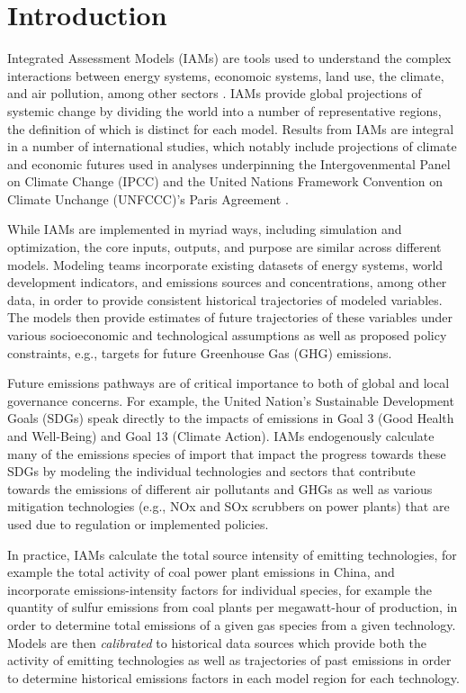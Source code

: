\section{Introduction}

Integrated Assessment Models (IAMs) are tools used to understand the complex
interactions between energy systems, economoic systems, land use, the climate,
and air pollution, among other sectors . IAMs provide
global projections of systemic change by dividing the world into a number of
representative regions, the definition of which is distinct for each
model. Results from IAMs are integral in a number of international studies,
which notably include projections of climate and economic futures used in
analyses underpinning the Intergovenmental Panel on Climate Change (IPCC)
 and the United Nations Framework Convention on Climate Unchange
(UNFCCC)'s Paris Agreement .

While IAMs are implemented in myriad ways, including simulation and
optimization, the core inputs, outputs, and purpose are similar across different
models. Modeling teams incorporate existing datasets of energy systems, world
development indicators, and emissions sources and concentrations, among other
data, in order to provide consistent historical trajectories of modeled
variables. The models then provide estimates of future trajectories of these
variables under various socioeconomic and technological assumptions as well as
proposed policy constraints, e.g., targets for future Greenhouse Gas (GHG)
emissions.

Future emissions pathways are of critical importance to both of global and local
governance concerns. For example, the United Nation's Sustainable Development
Goals (SDGs)  speak directly to the impacts of emissions in Goal 3
(Good Health and Well-Being) and Goal 13 (Climate Action). IAMs endogenously
calculate many of the emissions species of import that impact the progress
towards these SDGs by modeling the individual technologies and sectors that
contribute towards the emissions of different air pollutants and GHGs as well as
various mitigation technologies (e.g., NOx and SOx scrubbers on power plants)
that are used due to regulation or implemented policies.

In practice, IAMs calculate the total source intensity of emitting technologies,
for example the total activity of coal power plant emissions in China, and
incorporate emissions-intensity factors for individual species, for example the
quantity of sulfur emissions from coal plants per megawatt-hour of production,
in order to determine total emissions of a given gas species from a given
technology. Models are then \textit{calibrated} to historical data sources which
provide both the activity of emitting technologies as well as trajectories of
past emissions in order to determine historical emissions factors in each model
region for each technology.

